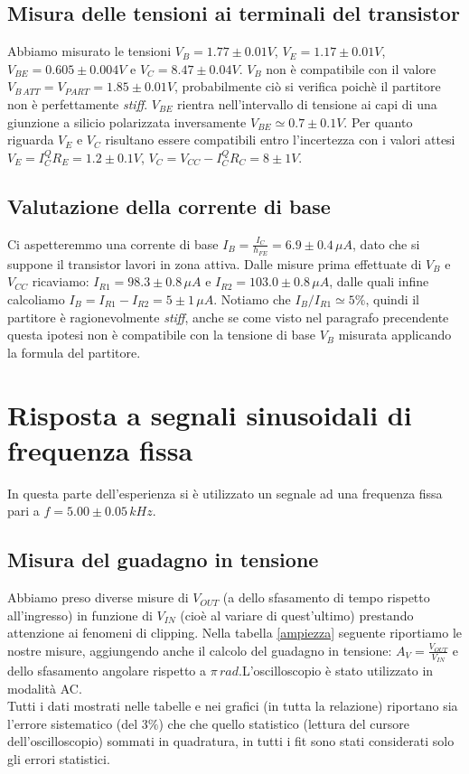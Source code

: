 \documentclass[10pt,a4paper]{article}
\begin{document}
\subsection{Misura delle tensioni ai terminali del transistor}
Abbiamo misurato le tensioni $V_B= 1.77\pm0.01V$, $V_E= 1.17\pm0.01V$, $V_{BE}= 0.605\pm0.004V$ e $V_C= 8.47\pm0.04V$. $V_B$ non è compatibile con il valore $V_{B\,ATT}= V_{PART}=1.85 \pm 0.01V$, probabilmente ciò si verifica poichè il partitore non è perfettamente \emph{stiff}. $V_{BE}$ rientra nell'intervallo di tensione ai capi di una giunzione a silicio polarizzata inversamente  $V_{BE} \simeq 0.7 \pm 0.1 V$. Per quanto riguarda $V_E$ e $V_C$ risultano essere compatibili entro l'incertezza con i valori attesi $V_E=I_C^Q R_E = 1.2 \pm 0.1 V$, $V_C=V_{CC}-I_C^Q R_C = 8 \pm 1 V$.


\subsection{Valutazione della corrente di base}
Ci aspetteremmo una corrente di base $I_B=\frac{I_C}{h_{FE}} = 6.9 \pm 0.4 \, \mu A$, dato che si suppone il transistor lavori in zona attiva. Dalle misure prima effettuate di $V_B$ e $V_{CC}$ ricaviamo: $I_{R1} = 98.3\pm0.8 \, \mu A$ e $I_{R2} = 103.0\pm0.8 \, \mu A$, dalle quali infine calcoliamo $I_B=I_{R1}-I_{R2}= 5\pm1 \,\mu A$. Notiamo che $I_B/I_{R1}\simeq 5\%$, quindi il partitore è ragionevolmente \emph{stiff}, anche se come visto nel paragrafo precendente questa ipotesi non è compatibile con la tensione di base $V_B$ misurata applicando la formula del partitore.
 
\section{Risposta a segnali sinusoidali di frequenza fissa}
In questa parte dell'esperienza si è utilizzato un segnale ad una frequenza fissa pari a $f= 5.00\pm0.05 \, kHz$.

\subsection{Misura del guadagno in tensione}
Abbiamo preso diverse misure di $V_{OUT}$ (a dello sfasamento di tempo rispetto all'ingresso) in funzione di $V_{IN}$ (cioè al variare di quest'ultimo) prestando attenzione ai fenomeni di clipping. Nella tabella \ref{ampiezza} seguente riportiamo le nostre misure, aggiungendo anche il calcolo del guadagno in tensione: $A_V=\frac{V_{OUT}}{V_{IN}}$ e dello sfasamento angolare rispetto a $\pi \,rad$.L'oscilloscopio è stato utilizzato in modalità AC.\\
Tutti i dati mostrati nelle tabelle e nei grafici (in tutta la relazione) riportano sia l'errore sistematico (del $3\%$) che che quello statistico (lettura del cursore dell'oscilloscopio) sommati in quadratura, in tutti i fit sono stati considerati solo gli errori statistici.
\end{document}
